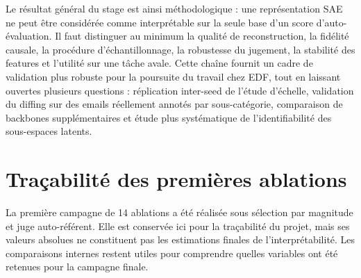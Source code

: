\documentclass[11pt]{article}
\begin{document}
Le résultat général du stage est ainsi méthodologique : une représentation SAE ne peut
être considérée comme interprétable sur la seule base d'un score d'auto-évaluation.
Il faut distinguer au minimum la qualité de reconstruction, la fidélité causale,
la procédure d'échantillonnage, la robustesse du jugement, la stabilité des features
et l'utilité sur une tâche avale. Cette chaîne fournit un cadre de validation plus
robuste pour la poursuite du travail chez EDF, tout en laissant ouvertes plusieurs
questions : réplication inter-seed de l'étude d'échelle, validation du diffing sur des
emails réellement annotés par sous-catégorie, comparaison de backbones supplémentaires
et étude plus systématique de l'identifiabilité des sous-espaces latents.

\appendix
\section{Traçabilité des premières ablations}

La première campagne de 14 ablations a été réalisée sous sélection par magnitude et
juge auto-référent. Elle est conservée ici pour la traçabilité du projet, mais ses
valeurs absolues ne constituent pas les estimations finales de l'interprétabilité.
Les comparaisons internes restent utiles pour comprendre quelles variables ont été
retenues pour la campagne finale.
\end{document}
